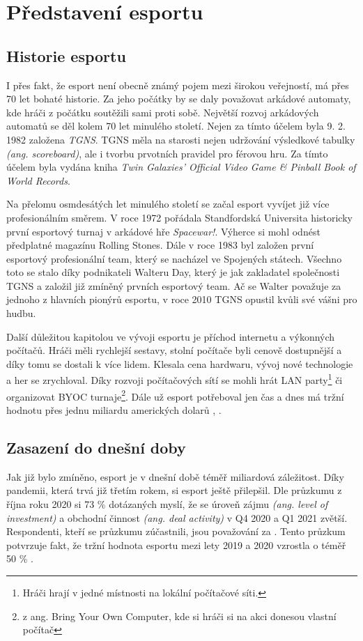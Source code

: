 \chapter{Představení esportu}
\section{Historie esportu}
I přes fakt, že esport není obecně známý pojem mezi širokou veřejností, má přes 70 let bohaté historie. Za jeho počátky by se
daly považovat arkádové automaty, kde hráči z počátku soutěžili sami proti sobě. Největší rozvoj arkádových automatů se děl kolem 70 let minulého 
století. Nejen za tímto účelem byla 9. 2. 1982 založena \textit{\ac{TGNS}}. \ac{TGNS} měla na starosti nejen udržování výsledkové tabulky \textit{(ang. scoreboard)},
ale i tvorbu prvotních pravidel pro férovou hru. Za tímto účelem byla vydána kniha \textit{Twin Galaxies' Official Video Game \& Pinball Book of World Records}.

Na přelomu osmdesátých let minulého století se začal esport vyvíjet již více profesionálním směrem. V roce 1972 pořádala Standfordská Universita historicky první
esportový turnaj v arkádové hře \textit{Spacewar!}. Výherce si mohl odnést předplatné magazínu Rolling Stones. Dále v roce 1983 byl založen první esportový profesionální team,
který se nacházel ve Spojených státech. Všechno toto se stalo díky podnikateli Walteru Day, který je jak zakladatel společnosti \ac{TGNS} a založil již zmíněný
prvních esportový team. Ač se Walter považuje za jednoho z hlavních pionýrů esportu, v roce 2010 \ac{TGNS} opustil kvůli své vášni pro hudbu.

Další důležitou kapitolou ve vývoji esportu je příchod internetu a výkonných počítačů. Hráči měli rychlejší sestavy, stolní počítače byli cenově dostupnější a díky tomu
se dostali k více lidem. Klesala cena hardwaru, vývoj nové technologie a her se zrychloval. Díky rozvoji počítačových sítí se mohli hrát LAN party\footnote{Hráči hrají v jedné
místnosti na lokální počítačové síti.} či organizovat BYOC turnaje\footnote{z ang. Bring Your Own Computer, kde si hráči si na akci donesou vlastní počítač}. Dále už esport 
potřeboval jen čas a dnes má tržní hodnotu přes jednu miliardu amerických dolarů \cite{Gough2021}, \cite{Larch2019}.
\section{Zasazení do dnešní doby}
Jak již bylo zmíněno, esport je v dnešní době téměř miliardová záležitost. Díky pandemii, která trvá již třetím rokem, si esport ještě přilepšil. Dle průzkumu \cite{Gough2021a}
z října roku 2020 si 73 \% dotázaných myslí, že se úroveň zájmu \textit{(ang. level of investment)} a obchodní činnost \textit{(ang. deal activity)} v Q4 2020 a Q1 2021
zvětší. Respondenti, kteří se průzkumu zúčastnili, jsou považování za . Tento průzkum potvrzuje fakt, že tržní hodnota esportu mezi lety 2019 a 2020
vzrostla o téměř 50 \% \cite{Gough2021}.

